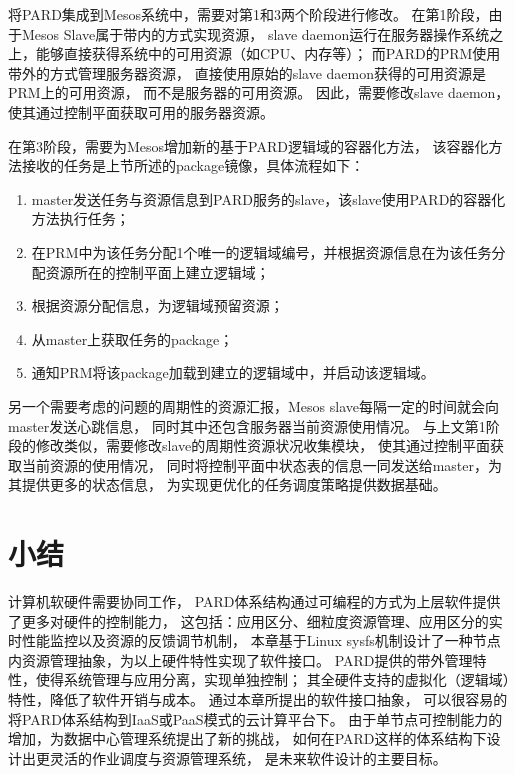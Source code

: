 将PARD集成到Mesos系统中，需要对第1和3两个阶段进行修改。
在第1阶段，由于Mesos Slave属于带内的方式实现资源，
slave daemon运行在服务器操作系统之上，能够直接获得系统中的可用资源（如CPU、内存等）；
而PARD的PRM使用带外的方式管理服务器资源，
直接使用原始的slave daemon获得的可用资源是PRM上的可用资源，
而不是服务器的可用资源。
因此，需要修改slave daemon，使其通过控制平面获取可用的服务器资源。

在第3阶段，需要为Mesos增加新的基于PARD逻辑域的容器化方法，
该容器化方法接收的任务是上节所述的package镜像，具体流程如下：

\begin{enumerate}[leftmargin=2\parindent, nolistsep, label=\arabic*）]
  \item master发送任务与资源信息到PARD服务的slave，该slave使用PARD的容器化方法执行任务；
  \item 在PRM中为该任务分配1个唯一的逻辑域编号，并根据资源信息在为该任务分配资源所在的控制平面上建立逻辑域；
  \item 根据资源分配信息，为逻辑域预留资源；
  \item 从master上获取任务的package；
  \item 通知PRM将该package加载到建立的逻辑域中，并启动该逻辑域。
\end{enumerate}

另一个需要考虑的问题的周期性的资源汇报，Mesos slave每隔一定的时间就会向master发送心跳信息，
同时其中还包含服务器当前资源使用情况。
与上文第1阶段的修改类似，需要修改slave的周期性资源状况收集模块，
使其通过控制平面获取当前资源的使用情况，
同时将控制平面中状态表的信息一同发送给master，为其提供更多的状态信息，
为实现更优化的任务调度策略提供数据基础。


%
%
\section{小结}

计算机软硬件需要协同工作，
PARD体系结构通过可编程的方式为上层软件提供了更多对硬件的控制能力，
这包括：应用区分、细粒度资源管理、应用区分的实时性能监控以及资源的反馈调节机制，
本章基于Linux sysfs机制设计了一种节点内资源管理抽象，为以上硬件特性实现了软件接口。
PARD提供的带外管理特性，使得系统管理与应用分离，实现单独控制；
其全硬件支持的虚拟化（逻辑域）特性，降低了软件开销与成本。
通过本章所提出的软件接口抽象，
可以很容易的将PARD体系结构到IaaS或PaaS模式的云计算平台下。
由于单节点可控制能力的增加，为数据中心管理系统提出了新的挑战，
如何在PARD这样的体系结构下设计出更灵活的作业调度与资源管理系统，
是未来软件设计的主要目标。

